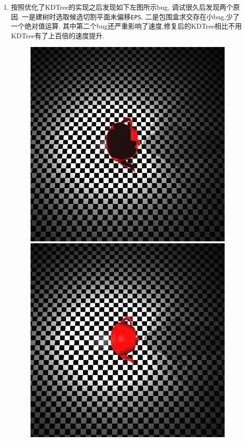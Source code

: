 \begin{enumerate}
\item 按照\cite{kdtree}优化了KDTree的实现之后发现如下左图所示bug, 调试很久后发现两个原因.
  一是建树时选取候选切割平面未偏移\verb|EPS|, 二是包围盒求交存在小bug,少了一个绝对值运算.
  其中第二个bug还严重影响了速度,修复后的KDTree相比不用KDTree有了上百倍的速度提升.
\begin{figure}[H]
  \centering
\begin{minipage}[b]{0.46\linewidth}
  \centering
  \includegraphics[width=\textwidth]{img/bug_teapot.png}
\end{minipage}
\begin{minipage}[b]{0.46\linewidth}
  \centering
  \includegraphics[width=\textwidth]{img/fixed_teapot.png}
\end{minipage}
  \caption*{\label{fig:kdtree_bug}}
\end{figure}


\end{enumerate}
